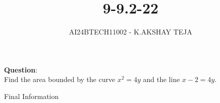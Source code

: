 \documentclass[journal]{IEEEtran}
\begin{document}

\vspace{3cm}

\title{9-9.2-22}
\author{AI24BTECH11002 - K.AKSHAY TEJA}
{\let\newpage\relax\maketitle}

\renewcommand{\thefigure}{\theenumi}
\renewcommand{\thetable}{\theenumi}
\setlength{\intextsep}{10pt} %


\renewcommand{\thetable}{\theenumi}


\textbf{Question}:\\
Find the area bounded by the curve  $x^{2} = 4y$ and the line $x - 2 = 4y$.


\solution
\begin{table}[h!]
	\centering
	
	\caption{Final Information}
	\label{tab:9-9.2-22}
\end{table}
\end{document}
